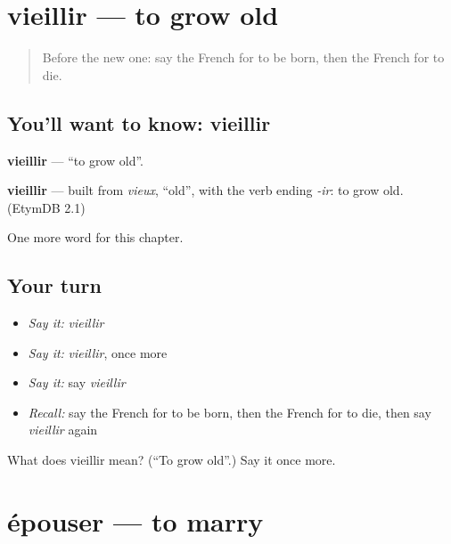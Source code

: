 \section[vieillir]{vieillir — to grow old}

\label{lesson:FR-C207-vieillir}



\begin{quote}
Before the new one: say the French for to be born, then the French for to die.
\end{quote}

\subsection*{You'll want to know: vieillir}
\textbf{vieillir} — \textquotedblleft{}to grow old\textquotedblright{}.

\begin{cousinweb}
\textbf{vieillir} — built from \emph{vieux}, \textquotedblleft{}old\textquotedblright{}, with the verb ending \emph{-ir}: to grow old. (EtymDB 2.1)
\end{cousinweb}

\begin{grammarlens}[title={What you've built}]
One more word for this chapter.
\end{grammarlens}

\subsection*{Your turn}
\begin{itemize}
\raggedright
  \item \emph{Say it:} \emph{vieillir}
  \item \emph{Say it:} \emph{vieillir}, once more
  \item \emph{Say it:} say \emph{vieillir}
  \item \emph{Recall:} say the French for to be born, then the French for to die, then say \emph{vieillir} again
\end{itemize}

\begin{tcolorbox}[breakable,colback=teal!4,colframe=teal!35!black,title={Before you move on}]
What does vieillir mean? (\textquotedblleft{}To grow old\textquotedblright{}.) Say it once more.
\end{tcolorbox}
\section[épouser]{épouser — to marry}

